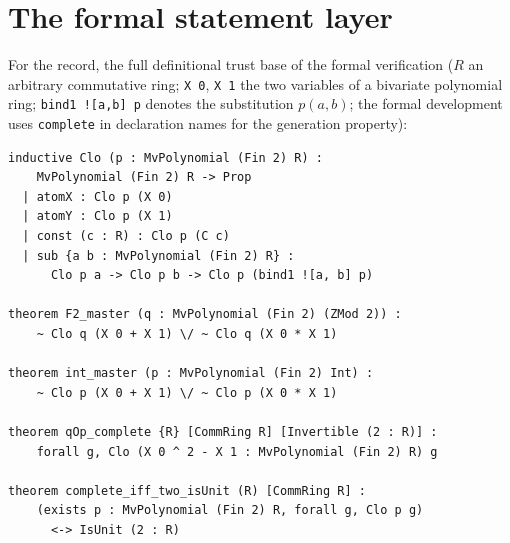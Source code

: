 \documentclass[11pt]{article}
\theoremstyle{definition}
\theoremstyle{remark}
\begin{document}
\appendix

\section{The formal statement layer}\label{app:lean}

For the record, the full definitional trust base of the formal
verification ($R$ an arbitrary commutative ring; \texttt{X 0},
\texttt{X 1} the two variables of a bivariate polynomial ring;
\texttt{bind1 ![a,b] p} denotes the substitution $p(a,b)$; the formal
development uses \texttt{complete} in declaration names for the
generation property):

\begin{verbatim}
inductive Clo (p : MvPolynomial (Fin 2) R) :
    MvPolynomial (Fin 2) R -> Prop
  | atomX : Clo p (X 0)
  | atomY : Clo p (X 1)
  | const (c : R) : Clo p (C c)
  | sub {a b : MvPolynomial (Fin 2) R} :
      Clo p a -> Clo p b -> Clo p (bind1 ![a, b] p)

theorem F2_master (q : MvPolynomial (Fin 2) (ZMod 2)) :
    ~ Clo q (X 0 + X 1) \/ ~ Clo q (X 0 * X 1)

theorem int_master (p : MvPolynomial (Fin 2) Int) :
    ~ Clo p (X 0 + X 1) \/ ~ Clo p (X 0 * X 1)

theorem qOp_complete {R} [CommRing R] [Invertible (2 : R)] :
    forall g, Clo (X 0 ^ 2 - X 1 : MvPolynomial (Fin 2) R) g

theorem complete_iff_two_isUnit (R) [CommRing R] :
    (exists p : MvPolynomial (Fin 2) R, forall g, Clo p g)
      <-> IsUnit (2 : R)
\end{verbatim}
\end{document}
